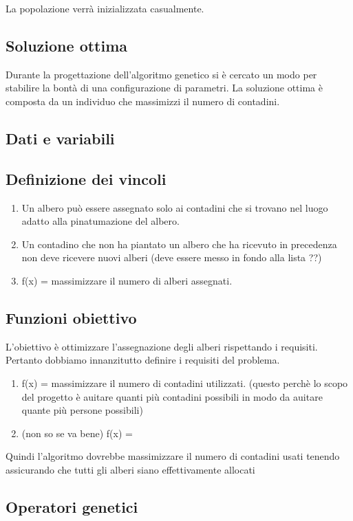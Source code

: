 La popolazione verrà inizializzata casualmente. 

\subsection{Soluzione ottima}
Durante la progettazione dell'algoritmo genetico si è cercato un modo per stabilire la bontà  di una configurazione di parametri. 
La soluzione ottima è composta da un individuo che massimizzi il numero di contadini. 

\subsection{Dati e variabili}

\subsection{Definizione dei vincoli}
\begin {enumerate}
\item Un albero può essere assegnato solo ai contadini che si trovano nel luogo adatto alla pinatumazione del albero. 
\item Un contadino che non ha piantato un albero che ha ricevuto in precedenza non deve ricevere nuovi alberi (deve essere messo in fondo alla lista ??)
\item f(x) = massimizzare il numero di alberi assegnati.
\end{enumerate}

\subsection {Funzioni obiettivo}
L'obiettivo è ottimizzare l'assegnazione degli alberi rispettando i requisiti. 
Pertanto dobbiamo innanzitutto definire i requisiti del problema. 
\begin {enumerate}
\item f(x) = massimizzare il numero di contadini utilizzati. (questo perchè lo scopo del progetto è auitare quanti più contadini possibili in modo da auitare quante più persone possibili)
\item (non so se va bene) f(x) = 
\end{enumerate}
Quindi l'algoritmo dovrebbe massimizzare il numero di contadini usati tenendo assicurando che tutti gli alberi siano effettivamente allocati

\subsection{Operatori genetici}

